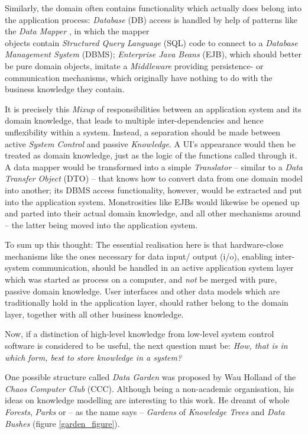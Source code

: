 Similarly, the domain often contains functionality which actually does belong
into the application process: \emph{Database} (DB) access is handled by help of
patterns like the \emph{Data Mapper} \cite{heller2005}, in which the mapper\\
objects contain \emph{Structured Query Language} (SQL) code to connect to a
\emph{Database Management System} (DBMS); \emph{Enterprise Java Beans} (EJB),
which should better be pure domain objects, imitate a \emph{Middleware}
providing persistence- or communication mechanisms, which originally have
nothing to do with the business knowledge they contain.

It is precisely this \emph{Mixup} of responsibilities between an application
system and its domain knowledge, that leads to multiple inter-dependencies and
hence unflexibility within a system. Instead, a separation should be made
between active \emph{System Control} and passive \emph{Knowledge}. A UI's
appearance would then be treated as domain knowledge, just as the logic of the
functions called through it. A data mapper would be transformed into a simple
\emph{Translator} -- similar to a \emph{Data Transfer Object} (DTO)
\cite{heller2005} -- that knows how to convert data from one domain model into
another; its DBMS access functionality, however, would be extracted and put
into the application system. Monstrosities like EJBs would likewise be opened
up and parted into their actual domain knowledge, and all other mechanisms
around -- the latter being moved into the application system.

To sum up this thought: The essential realisation here is that hardware-close
mechanisms like the ones necessary for data input/ output (i/o), enabling
inter-system communication, should be handled in an active application system
layer which was started as process on a computer, and \emph{not} be merged with
pure, passive domain knowledge. User interfaces and other data models which are
traditionally hold in the application layer, should rather belong to the domain
layer, together with all other business knowledge.

Now, if a distinction of high-level knowledge from low-level system control
software is considered to be useful, the next question must be: \textit{How,
that is in which form, best to store knowledge in a system?}

One possible structure called \emph{Data Garden} \cite{holland} was proposed by
Wau Holland of the \emph{Chaos Computer Club} (CCC). Although being a
non-academic organisation, his ideas on knowledge modelling are interesting to
this work. He dreamt of whole \emph{Forests}, \emph{Parks} or -- as the name
says -- \emph{Gardens} of \emph{Knowledge Trees} and \emph{Data Bushes} (figure
\ref{garden_figure}).

